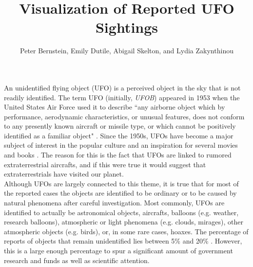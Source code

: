 \documentclass[journal]{vgtc}                %
\title{Visualization of Reported UFO Sightings}
\author{Peter Bernstein, Emily Dutile, Abigail Skelton, and Lydia Zakynthinou}
\begin{document}


\maketitle

An unidentified flying object (UFO) is a perceived object in the sky that is not readily identified. The term UFO (initially, \textit{UFOB}) appeared in 1953 when the United States Air Force used it to describe ``any airborne object which by performance, aerodynamic characteristics, or unusual features, does not conform to any presently known aircraft or missile type, or which cannot be positively identified as a familiar object" \cite{ufowiki}. Since the 1950s, UFOs have become a major subject of interest in the popular culture and an inspiration for several movies and books \cite{history}. The reason for this is the fact that UFOs are linked to rumored extraterrestrial aircrafts, and if this were true it would suggest that extraterrestrials have visited our planet.\\
\indent Although UFOs are largely connected to this theme, it is true that for most of the reported cases the objects are identified to be ordinary or to be caused by natural phenomena after careful investigation. Most commonly, UFOs are identified to actually be astronomical objects, aircrafts, balloons (e.g. weather, research balloons), atmospheric or light phenomena (e.g. clouds, mirages), other atmospheric objects (e.g. birds), or, in some rare cases, hoaxes. The percentage of reports of objects that remain unidentified lies between 5\% and 20\%  \cite{ufowiki}. However, this is a large enough percentage to spur a significant amount of government research and funds as well as scientific attention.\\
\end{document}
